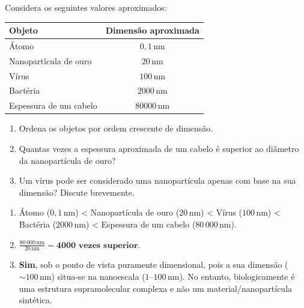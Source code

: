 \documentclass[11pt,a4paper]{article}
\newcounter{exercicio}
\newenvironment{exercicio}[1]
{
	\refstepcounter{exercicio}
	\begin{tcolorbox}[
		enhanced,
		breakable,
		colback=white,
		colframe=eublue,
		boxrule=0.8pt,
		arc=2mm,
		left=3mm,
		right=3mm,
		top=2mm,
		bottom=2mm,
		title={
			\textbf{Exercício \theexercicio}
			\hspace{1mm}--\hspace{1mm}
			#1
		},
		coltitle=white,
		colbacktitle=eublue,
		fonttitle=\bfseries
		]
	}
	{
	\end{tcolorbox}
}
\begin{document}
	\begin{exercicio}{Ordenar o mundo invisível}
		
		Considera os seguintes valores aproximados:
		
		\begin{center}
			\begin{tabular}{lc}
				\toprule
				\textbf{Objeto} & \textbf{Dimensão aproximada}\\
				\midrule
				Átomo & \(0,1\,\mathrm{nm}\)\\
				Nanopartícula de ouro & \(20\,\mathrm{nm}\)\\
				Vírus & \(100\,\mathrm{nm}\)\\
				Bactéria & \(2000\,\mathrm{nm}\)\\
				Espessura de um cabelo & \(80000\,\mathrm{nm}\)\\
				\bottomrule
			\end{tabular}
		\end{center}
		
		\begin{enumerate}[label=\alph*)]
			\item Ordena os objetos por ordem crescente de dimensão.
			\item Quantas vezes a espessura aproximada de um cabelo é superior ao diâmetro da nanopartícula de ouro?
			\item Um vírus pode ser considerado uma nanopartícula apenas com base na sua dimensão? Discute brevemente.
		\end{enumerate}
		
		\begin{solucao}
			\begin{enumerate}[label=\alph*)]
				\item Átomo (\(0,1\,\mathrm{nm}\)) < Nanopartícula de ouro (\(20\,\mathrm{nm}\)) < Vírus (\(100\,\mathrm{nm}\)) < Bactéria (\(2000\,\mathrm{nm}\)) < Espessura de um cabelo (\(80\,000\,\mathrm{nm}\)).
				\item \(\frac{80\,000\,\mathrm{nm}}{20\,\mathrm{nm}} = \mathbf{4000\text{ vezes superior}}\).
				\item \textbf{Sim}, sob o ponto de vista puramente dimensional, pois a sua dimensão (\(\sim 100\,\mathrm{nm}\)) situa-se na nanoescala (\(1\text{--}100\,\mathrm{nm}\)). No entanto, biologicamente é uma estrutura supramolecular complexa e não um material/nanopartícula sintética.
			\end{enumerate}
		\end{solucao}
		
	\end{exercicio}
	
\end{document}
